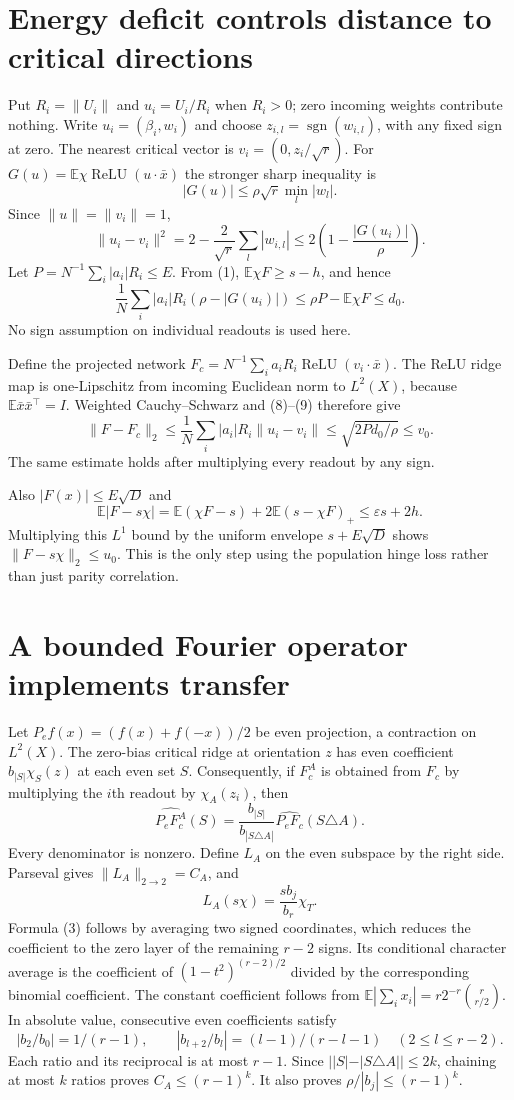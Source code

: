 \documentclass[11pt]{article}
\newcommand{\E}{\mathbb E}\newcommand{\R}{\mathbb R}
\newcommand{\relu}{\operatorname{ReLU}}
\begin{document}
\section{Energy deficit controls distance to critical directions}
Put $R_i=\|U_i\|$ and $u_i=U_i/R_i$ when $R_i>0$; zero incoming
weights contribute nothing. Write $u_i=(\beta_i,w_i)$ and choose
$z_{i,l}=\operatorname{sgn}(w_{i,l})$, with any fixed sign at zero.
The nearest critical vector is $v_i=(0,z_i/\sqrt r)$.
For $G(u)=\E\chi\relu(u\cdot\bar x)$ the stronger sharp inequality is
\[
 |G(u)|\le\rho\sqrt r\min_l|w_l|.                     \tag{7}
\]
Since $\|u\|=\|v_i\|=1$,
\[
 \|u_i-v_i\|^2=2-\frac2{\sqrt r}\sum_l|w_{i,l}|
             \le2\left(1-\frac{|G(u_i)|}{\rho}\right).
 \tag{8}
\]
Let $P=N^{-1}\sum_i|a_i|R_i\le E$. From (1),
$\E\chi F\ge s-h$, and hence
\[
 \frac1N\sum_i|a_i|R_i(\rho-|G(u_i)|)
       \le\rho P-\E\chi F\le d_0.                    \tag{9}
\]
No sign assumption on individual readouts is used here.

Define the projected network
$F_c=N^{-1}\sum_i a_iR_i\relu(v_i\cdot\bar x)$.
The ReLU ridge map is one-Lipschitz from incoming Euclidean norm to
$L^2(X)$, because $\E\bar x\bar x^\top=I$.
Weighted Cauchy--Schwarz and (8)--(9) therefore give
\[
 \|F-F_c\|_2\le\frac1N\sum_i|a_i|R_i\|u_i-v_i\|
                    \le\sqrt{2Pd_0/\rho}\le v_0.     \tag{10}
\]
The same estimate holds after multiplying every readout by any sign.

Also $|F(x)|\le E\sqrt D$ and
\[
 \E|F-s\chi|=\E(\chi F-s)+2\E(s-\chi F)_+
                  \le\varepsilon s+2h.
\]
Multiplying this $L^1$ bound by the uniform envelope $s+E\sqrt D$
shows $\|F-s\chi\|_2\le u_0$. This is the only step using the
population hinge loss rather than just parity correlation.

\section{A bounded Fourier operator implements transfer}
Let $P_e f(x)=(f(x)+f(-x))/2$ be even projection, a contraction on
$L^2(X)$. The zero-bias critical ridge at orientation $z$ has even
coefficient $b_{|S|}\chi_S(z)$ at each even set $S$.
Consequently, if $F_c^A$ is obtained from $F_c$ by multiplying the
$i$th readout by $\chi_A(z_i)$, then
\[
 \widehat{P_eF_c^A}(S)
 =\frac{b_{|S|}}{b_{|S\triangle A|}}
                   \widehat{P_eF_c}(S\triangle A).
 \tag{11}
\]
Every denominator is nonzero. Define $L_A$ on the even subspace by
the right side. Parseval gives $\|L_A\|_{2\to2}=C_A$, and
\[
 L_A(s\chi)=\frac{s b_j}{b_r}\chi_T.
\]
Formula (3) follows by averaging two signed coordinates, which reduces
the coefficient to the zero layer of the remaining $r-2$ signs. Its
conditional character average is the coefficient of
$(1-t^2)^{(r-2)/2}$ divided by the corresponding binomial coefficient.
The constant coefficient follows from
$\E|\sum_i x_i|=r2^{-r}\binom r{r/2}$.
In absolute value, consecutive even coefficients satisfy
\[
 |b_2/b_0|=1/(r-1),\qquad
 |b_{l+2}/b_l|=(l-1)/(r-l-1)\quad(2\le l\le r-2).
\]
Each ratio and its reciprocal is at most $r-1$.
Since $||S|-|S\triangle A||\le2k$, chaining at most $k$ ratios
proves $C_A\le(r-1)^k$. It also proves
$\rho/|b_j|\le(r-1)^k$.
\end{document}
